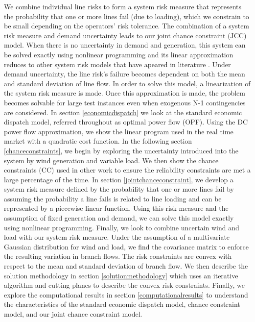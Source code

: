 We combine individual line risks to form a system risk measure that represents the probability that one or more lines fail (due to loading), which we constrain to be small depending on the operators' risk tolerance.  The combination of a system risk measure and demand uncertainty leads to our joint chance constraint (JCC) model.  When there is no uncertainty in demand and generation, this  system can be solved exactly using nonlinear programming and its linear approximation reduces to other system risk models that have apeared in literature \cite{vrakopoulou_2013c,wang_2013}.  Under demand uncertainty, the line risk's failure becomes dependent on both the mean and standard deviation of line flow. In order to solve this model, a linearization of the system risk measure is made.  Once this approximation is made, the problem becomes solvable for large test instances even when exogenous N-1 contingencies are considered.  
In section \ref{economicdispatch} we look at the standard economic dispatch model, referred throughout as optimal power flow (OPF).  Using the DC power flow approximation, we show the linear program used in the real time market with a quadratic cost function. In the following section \ref{chanceconstraints}, we begin by exploring the uncertainty introduced into the system by wind generation and variable load.  We then show the chance constraints (CC) used in other work to ensure the reliability constraints are met a large percentage of the time.  In section \ref{jointchanceconstraint}, we develop a system risk measure defined by the probability that one or more lines fail by assuming the probability a line fails is related to line loading and can be represented by a piecewise linear function.  Using this risk measure and the assumption of fixed generation and demand, we can solve this model exactly using nonlinear programming.  Finally, we look to combine uncertain wind and load with our system risk measure.  Under the assumption of a multivariate Gaussian distribution for wind and load, we find the covariance matrix to enforce the resulting variation in branch flows.  The risk constraints are convex with respect to the mean and standard deviation of branch flow.  We then describe the solution methodology in section \ref{solutionmethodology} which uses an iterative algorithm and cutting planes to describe the convex risk constraints.  Finally, we explore the computational results in section \ref{computationalresults} to understand the characteristics of the standard economic dispatch model, chance constraint model, and our joint chance constraint model.


